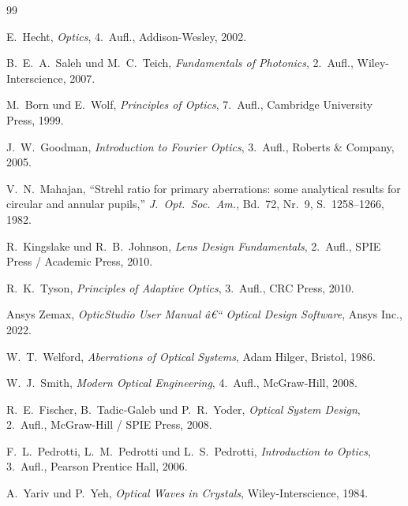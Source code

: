 ﻿\documentclass[12pt,a4paper]{article}
\theoremstyle{definition}
\begin{document}
	\begin{thebibliography}{99}
		
		E.~Hecht,
		\textit{Optics}, 4.~Aufl.,
		Addison-Wesley, 2002.
		
		B.~E.~A.~Saleh und M.~C.~Teich,
		\textit{Fundamentals of Photonics}, 2.~Aufl.,
		Wiley-Interscience, 2007.
		
		M.~Born und E.~Wolf,
		\textit{Principles of Optics}, 7.~Aufl.,
		Cambridge University Press, 1999.
		
		J.~W.~Goodman,
		\textit{Introduction to Fourier Optics}, 3.~Aufl.,
		Roberts \& Company, 2005.
		
		V.~N.~Mahajan,
		``Strehl ratio for primary aberrations: some analytical results for circular
		and annular pupils,''
		\textit{J.~Opt.~Soc.~Am.}, Bd.~72, Nr.~9, S.~1258--1266, 1982.
		
		R.~Kingslake und R.~B.~Johnson,
		\textit{Lens Design Fundamentals}, 2.~Aufl.,
		SPIE Press / Academic Press, 2010.
		
		R.~K.~Tyson,
		\textit{Principles of Adaptive Optics}, 3.~Aufl.,
		CRC Press, 2010.

		Ansys Zemax,
		\textit{OpticStudio User Manual â€“ Optical Design Software},
		Ansys Inc., 2022.

		W.~T.~Welford,
		\textit{Aberrations of Optical Systems},
		Adam Hilger, Bristol, 1986.

		W.~J.~Smith,
		\textit{Modern Optical Engineering}, 4.~Aufl.,
		McGraw-Hill, 2008.

		R.~E.~Fischer, B.~Tadic-Galeb und P.~R.~Yoder,
		\textit{Optical System Design}, 2.~Aufl.,
		McGraw-Hill / SPIE Press, 2008.

		F.~L.~Pedrotti, L.~M.~Pedrotti und L.~S.~Pedrotti,
		\textit{Introduction to Optics}, 3.~Aufl.,
		Pearson Prentice Hall, 2006.

		A.~Yariv und P.~Yeh,
		\textit{Optical Waves in Crystals},
		Wiley-Interscience, 1984.


\end{thebibliography}
\end{document}
